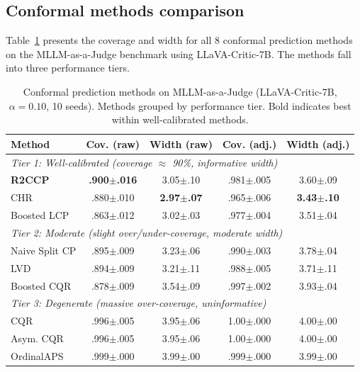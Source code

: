 \documentclass{article}
\begin{document}
\subsection{Conformal methods comparison}
\label{sec:methods_comparison}

Table~\ref{tab:all_methods} presents the coverage and width for all 8 conformal prediction methods on the MLLM-as-a-Judge benchmark using LLaVA-Critic-7B. The methods fall into three performance tiers.

\begin{table}[t]
\centering
\caption{Conformal prediction methods on MLLM-as-a-Judge (LLaVA-Critic-7B, $\alpha=0.10$, 10 seeds). Methods grouped by performance tier. Bold indicates best within well-calibrated methods.}
\label{tab:all_methods}
\small
\begin{tabular}{lcccc}
\toprule
\textbf{Method} & \textbf{Cov. (raw)} & \textbf{Width (raw)} & \textbf{Cov. (adj.)} & \textbf{Width (adj.)} \\
\midrule
\multicolumn{5}{l}{\emph{Tier 1: Well-calibrated (coverage $\approx$ 90\%, informative width)}} \\
\textbf{R2CCP} & \textbf{.900$\pm$.016} & 3.05$\pm$.10 & .981$\pm$.005 & 3.60$\pm$.09 \\
CHR & .880$\pm$.010 & \textbf{2.97$\pm$.07} & .965$\pm$.006 & \textbf{3.43$\pm$.10} \\
Boosted LCP & .863$\pm$.012 & 3.02$\pm$.03 & .977$\pm$.004 & 3.51$\pm$.04 \\
\midrule
\multicolumn{5}{l}{\emph{Tier 2: Moderate (slight over/under-coverage, moderate width)}} \\
Naive Split CP & .895$\pm$.009 & 3.23$\pm$.06 & .990$\pm$.003 & 3.78$\pm$.04 \\
LVD & .894$\pm$.009 & 3.21$\pm$.11 & .988$\pm$.005 & 3.71$\pm$.11 \\
Boosted CQR & .878$\pm$.009 & 3.54$\pm$.09 & .997$\pm$.002 & 3.93$\pm$.04 \\
\midrule
\multicolumn{5}{l}{\emph{Tier 3: Degenerate (massive over-coverage, uninformative)}} \\
CQR & .996$\pm$.005 & 3.95$\pm$.06 & 1.00$\pm$.000 & 4.00$\pm$.00 \\
Asym. CQR & .996$\pm$.005 & 3.95$\pm$.06 & 1.00$\pm$.000 & 4.00$\pm$.00 \\
OrdinalAPS & .999$\pm$.000 & 3.99$\pm$.00 & .999$\pm$.000 & 3.99$\pm$.00 \\
\bottomrule
\end{tabular}
\end{table}
\end{document}
